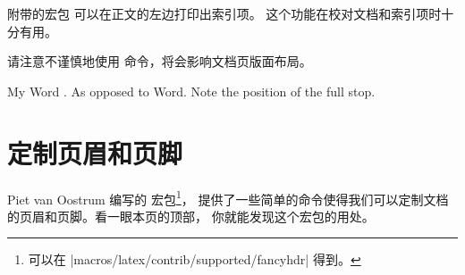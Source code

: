 
\LaTeXe{} 附带的宏包  可以在正文的左边打印出索引项。
这个功能在校对文档和索引项时十分有用。



请注意不谨慎地使用  命令，将会影响文档页版面布局。
\begin{example}
My Word . As opposed
to Word. Note the
position of the full stop.
\end{example}

\section{定制页眉和页脚}
\label{sec:fancy}


Piet van
Oostrum 编写的  宏包\footnote{可以在 \CTANref|macros/latex/contrib/supported/fancyhdr| 得到。}，
提供了一些简单的命令使得我们可以定制文档的页眉和页脚。看一眼本页的顶部，
你就能发现这个宏包的用处。


